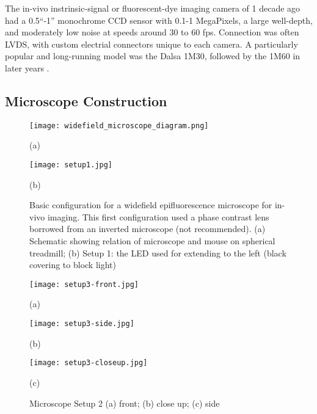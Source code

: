 \documentclass[../main.tex]{subfiles}
\begin{document}
The in-vivo instrinsic-signal or fluorescent-dye imaging camera of 1 decade ago had a 0.5``-1'' monochrome CCD sensor with 0.1-1 MegaPixels, a large well-depth, and moderately low noise at speeds around 30 to 60 fps.
Connection was often LVDS, with custom electrial connectors unique to each camera.
A particularly popular and long-running model was the Dalsa 1M30, followed by the 1M60 in later years \cite{takahashi_vivo_2006}.

\subsection{Microscope Construction}\label{sec:microscope-construction}

\begin{figure}[htb]
	\begin{minipage}[t]{0.49\linewidth}\centering \texttt{[image: widefield\_microscope\_diagram.png]} \medskip \centerline{(a)}
	\end{minipage}
	\hfill
	\begin{minipage}[t]{0.49\linewidth}\centering \texttt{[image: setup1.jpg]} \medskip \centerline{(b)}
	\end{minipage}
	\caption{Basic configuration for a widefield epifluorescence microscope for in-vivo imaging.
		This first configuration used a phase contrast lens borrowed from an inverted microscope (not recommended).
		(a) Schematic showing relation of microscope and mouse on spherical treadmill; (b) Setup 1: the LED used for extending to the left (black covering to block light)}
	\label{fig:Sampling}
\end{figure}

\begin{figure}[htb]
	\begin{minipage}[t]{0.45\linewidth}\centering
		\texttt{[image: setup3-front.jpg]}
		\centerline{(a)}
	\end{minipage}
	\hfill
	\begin{minipage}[t]{0.45\linewidth}\centering
		\texttt{[image: setup3-side.jpg]}
		\centerline{(b)}
	\end{minipage}
	\begin{minipage}[t]{\linewidth}\centering
		\texttt{[image: setup3-closeup.jpg]}
		\centerline{(c)}
	\end{minipage}
	\caption{
		Microscope Setup 2 (a) front;
		(b) close up; (c) side}
	\label{fig:motion sensors}
\end{figure}
\end{document}
